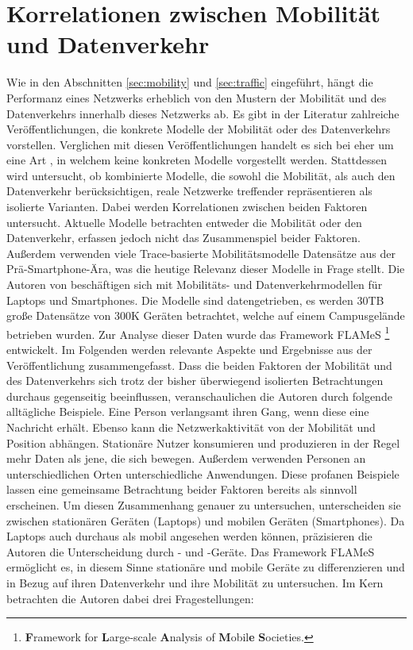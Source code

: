 \documentclass[12pt, a4paper]{article}
\begin{document}
\section{Korrelationen zwischen Mobilität und Datenverkehr}
\label{sec:correlations}

Wie in den Abschnitten \ref{sec:mobility} und \ref{sec:traffic} eingeführt, hängt die Performanz eines
Netzwerks erheblich von den Mustern der Mobilität und des Datenverkehrs innerhalb dieses Netzwerks ab.
Es gibt in der Literatur zahlreiche Veröffentlichungen, die konkrete Modelle der Mobilität oder des Datenverkehrs
vorstellen. Verglichen mit diesen Veröffentlichungen handelt es sich bei \cite{Alipour2018} eher um eine Art 
, in welchem keine konkreten Modelle vorgestellt werden. Stattdessen wird untersucht, 
ob kombinierte Modelle, die sowohl die Mobilität, als auch den Datenverkehr berücksichtigen, reale Netzwerke 
treffender repräsentieren als isolierte Varianten. Dabei werden Korrelationen zwischen beiden Faktoren untersucht.\newline
Aktuelle Modelle betrachten entweder die Mobilität oder den Datenverkehr, erfassen jedoch nicht das Zusammenspiel beider Faktoren.
Außerdem verwenden viele Trace-basierte Mobilitätsmodelle Datensätze aus der Prä-Smartphone-Ära,
was die heutige Relevanz dieser Modelle in Frage stellt. \cite{Alipour2018}
Die Autoren von \cite{Alipour2018} beschäftigen sich mit Mobilitäts- und Datenverkehrmodellen für Laptops und Smartphones.
Die Modelle sind datengetrieben, es werden $30$\textsc{TB} große Datensätze von $300$\textsc{K} Geräten betrachtet, 
welche auf einem Campusgelände betrieben wurden. Zur Analyse dieser Daten wurde das Framework FLAMeS \footnote{\textbf{F}ramework for 
\textbf{L}arge-scale \textbf{A}nalysis of \textbf{M}obil\textbf{e} \textbf{S}ocieties.} entwickelt.
Im Folgenden werden relevante Aspekte und Ergebnisse aus der Veröffentlichung zusammengefasst.\newline\newline
Dass die beiden Faktoren der Mobilität und des Datenverkehrs sich trotz der bisher überwiegend isolierten Betrachtungen
durchaus gegenseitig beeinflussen, veranschaulichen die Autoren durch folgende alltägliche Beispiele. 
Eine Person verlangsamt ihren Gang, wenn diese eine Nachricht erhält. Ebenso kann die Netzwerkaktivität von der
Mobilität und Position abhängen. Stationäre Nutzer konsumieren und produzieren in der Regel mehr Daten als jene, 
die sich bewegen. Außerdem verwenden Personen an unterschiedlichen Orten unterschiedliche Anwendungen.
Diese profanen Beispiele lassen eine gemeinsame Betrachtung beider Faktoren bereits als sinnvoll erscheinen.
Um diesen Zusammenhang genauer zu untersuchen, unterscheiden sie zwischen stationären Geräten (Laptops) und mobilen Geräten
(Smartphones). Da Laptops auch durchaus als mobil angesehen werden können, präzisieren die Autoren die Unterscheidung
durch - und -Geräte. Das Framework FLAMeS ermöglicht es, 
in diesem Sinne stationäre und mobile Geräte zu differenzieren und in Bezug auf ihren Datenverkehr und ihre 
Mobilität zu untersuchen. Im Kern betrachten die Autoren dabei drei Fragestellungen:
\end{document}
